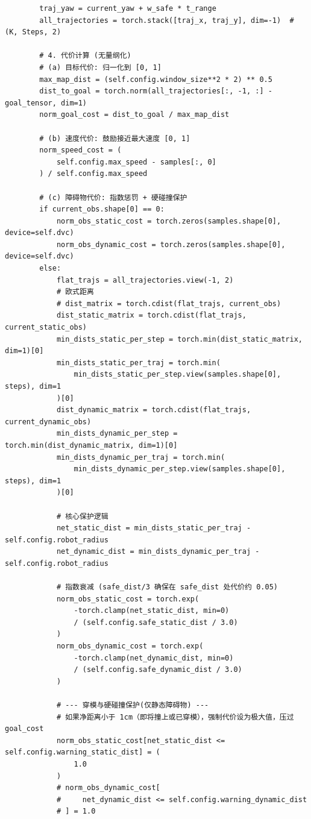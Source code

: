 \begin{verbatim}
        traj_yaw = current_yaw + w_safe * t_range
        all_trajectories = torch.stack([traj_x, traj_y], dim=-1)  # (K, Steps, 2)

        # 4. 代价计算 (无量纲化)
        # (a) 目标代价: 归一化到 [0, 1]
        max_map_dist = (self.config.window_size**2 * 2) ** 0.5
        dist_to_goal = torch.norm(all_trajectories[:, -1, :] - goal_tensor, dim=1)
        norm_goal_cost = dist_to_goal / max_map_dist

        # (b) 速度代价: 鼓励接近最大速度 [0, 1]
        norm_speed_cost = (
            self.config.max_speed - samples[:, 0]
        ) / self.config.max_speed

        # (c) 障碍物代价: 指数惩罚 + 硬碰撞保护
        if current_obs.shape[0] == 0:
            norm_obs_static_cost = torch.zeros(samples.shape[0], device=self.dvc)
            norm_obs_dynamic_cost = torch.zeros(samples.shape[0], device=self.dvc)
        else:
            flat_trajs = all_trajectories.view(-1, 2)
            # 欧式距离
            # dist_matrix = torch.cdist(flat_trajs, current_obs)
            dist_static_matrix = torch.cdist(flat_trajs, current_static_obs)
            min_dists_static_per_step = torch.min(dist_static_matrix, dim=1)[0]
            min_dists_static_per_traj = torch.min(
                min_dists_static_per_step.view(samples.shape[0], steps), dim=1
            )[0]
            dist_dynamic_matrix = torch.cdist(flat_trajs, current_dynamic_obs)
            min_dists_dynamic_per_step = torch.min(dist_dynamic_matrix, dim=1)[0]
            min_dists_dynamic_per_traj = torch.min(
                min_dists_dynamic_per_step.view(samples.shape[0], steps), dim=1
            )[0]

            # 核心保护逻辑
            net_static_dist = min_dists_static_per_traj - self.config.robot_radius
            net_dynamic_dist = min_dists_dynamic_per_traj - self.config.robot_radius

            # 指数衰减 (safe_dist/3 确保在 safe_dist 处代价约 0.05)
            norm_obs_static_cost = torch.exp(
                -torch.clamp(net_static_dist, min=0)
                / (self.config.safe_static_dist / 3.0)
            )
            norm_obs_dynamic_cost = torch.exp(
                -torch.clamp(net_dynamic_dist, min=0)
                / (self.config.safe_dynamic_dist / 3.0)
            )

            # --- 穿模与硬碰撞保护(仅静态障碍物) ---
            # 如果净距离小于 1cm（即将撞上或已穿模），强制代价设为极大值，压过 goal_cost
            norm_obs_static_cost[net_static_dist <= self.config.warning_static_dist] = (
                1.0
            )
            # norm_obs_dynamic_cost[
            #     net_dynamic_dist <= self.config.warning_dynamic_dist
            # ] = 1.0


\end{verbatim}
